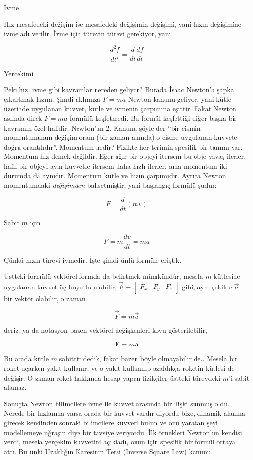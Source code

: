 \documentclass[12pt,fleqn]{article}\usepackage{../../common}
\begin{document}
İvme

Hız mesafedeki değişim ise mesafedeki değişimin değişimi, yani hızın
değişimine ivme adı verilir. İvme için türevin türevi gerekiyor, yani 

$$ \frac{d^2f}{dt^2} = \frac{d}{dt} \frac{df}{dt} $$

Yerçekimi

Peki hız, ivme gibi kavramlar nereden geliyor? Burada İsaac Newton'a şapka
çıkartmak lazım. Şimdi aklımıza $F = ma$ Newton kanunu geliyor, yani kütle
üzerinde uygulanan kuvvet, kütle ve ivmenin çarpımına eşittir. Fakat Newton
aslında direk $F=ma$ formülü keşfetmedi. Bu formül keşfettiği diğer başka
bir kavramın özel halidir. Newton'un 2. Kanunu şöyle der ``bir cismin
momentumunun değişim oranı (bir zaman anında) o cisme uygulanan kuvvete
doğru orantılıdır''. Momentum nedir? Fizikte her terimin spesifik bir
tanımı var. Momentum hız demek değildir. Eğer ağır bir objeyi itersem bu
obje yavaş ilerler, hafif bir objeyi aynı kuvvetle itersem daha hızlı
ilerler, ama momentum iki durumda da aynıdır. Momentum kütle ve hızın
çarpımıdır. Ayrıca Newton momentumdaki {\em değişimden} bahsetmiştir, yani
başlangıç formülü şudur:

$$ F = \frac{d}{dt} (mv)$$

Sabit $m$ için

$$ F = m \frac{dv}{dt} = ma$$

Çünkü hızın türevi ivmedir. İşte şimdi ünlü formüle eriştik.

Üstteki formülü vektörel formda da belirtmek mümkündür, mesela $m$ kütlesine
uygulanan kuvvet üç boyutlu olabilir, $\vec{F} = [\begin{array}{ccc} F_x & F_y & F_z \end{array}]$ gibi, 
aynı şekilde $\vec{a}$ bir vektör olabilir, o zaman

$$
\vec{F} = m \vec{a}
$$

deriz, ya da notasyon bazen vektörel değişkenleri koyu gösterilebilir,

$$
\mathbf{F} = m \mathbf{a}
$$


Bu arada kütle $m$ sabittir dedik, fakat bazen böyle olmayabilir
de.. Mesela bir roket uçarken yakıt kullanır, ve o yakıt kullanılıp
azaldıkça roketin kütlesi de değişir. O zaman roket hakkında hesap yapan
fizikçiler üstteki türevdeki $m$'i sabit alamaz.

Sonuçta Newton bilimcilere ivme ile kuvvet arasında bir ilişki sunmuş
oldu. Nerede bir hızlanma varsa orada bir kuvvet vardır diyordu bize,
dinamik alanına girecek kendinden sonraki bilimcilere kuvveti bulun ve onu
yaratan şeyi modellemeye uğraşın diye bir tavsiye veriyordu. İlk örnekleri
Newton'un kendisi verdi, mesela yerçekim kuvvetini açıkladı, onun için
spesifik bir formül ortaya attı. Bu ünlü Uzaklığın Karesinin Tersi (Inverse
Square Law) kanunu.
\end{document}
